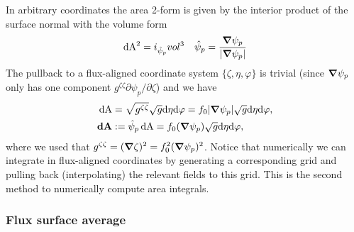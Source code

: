 In arbitrary coordinates the area 2-form is given by the interior product of the
surface normal with the volume form
\begin{align}
\label{}
\,\mathrm{dA}^2 = i_{\hat \psi_p} vol^3 \quad \hat \psi_p = \frac{{\boldsymbol{\nabla}} \psi_p}{|{\boldsymbol{\nabla}} \psi_p|}
\end{align}
The pullback to a flux-aligned coordinate system $\{\zeta, \eta, \varphi\}$ is trivial (since ${\boldsymbol{\nabla}} \psi_p$ only has one component $g^{\zeta\zeta} \partial \psi_p / \partial \zeta$) and we have
\begin{align}
\,\mathrm{dA} &= \sqrt{g^{\zeta\zeta}} \sqrt{g} \mathrm{d}\eta\mathrm{d}\varphi = f_0|{\boldsymbol{\nabla}}\psi_p|\sqrt{g}\mathrm{d}\eta\mathrm{d}\varphi,
\\
{\boldsymbol{\,\mathrm{dA}}} &:= \hat\psi_p \,\mathrm{dA} = f_0 ({\boldsymbol{\nabla}}\psi_p) \sqrt{g}\mathrm{d}\eta\mathrm{d}\varphi,\quad
\label{}
\end{align}
where we used that $g^{\zeta\zeta} = ({\boldsymbol{\nabla}}\zeta)^2 = f_0^2({\boldsymbol{\nabla}}\psi_p)^2$.
Notice that numerically we can integrate in flux-aligned coordinates by generating a corresponding
grid and pulling back (interpolating) the relevant fields to this grid. This is the second method
to numerically compute area integrals.

\subsubsection{Flux surface average}


